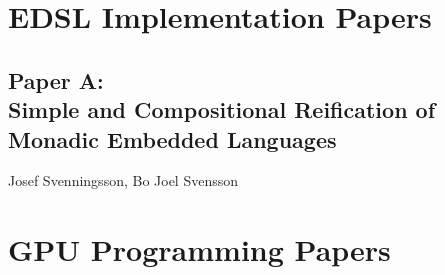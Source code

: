 \documentclass[a4paper]{book}
\newcommand{\paperA}{Paper A}
\newcommand{\paperATitle}{Simple and Compositional Reification of Monadic Embedded Languages}
\begin{document}
%
%





\clearpage{}

%
%


\chapter{EDSL Implementation Papers}
\label{chap:EDSLImplementation}
% 
\cleardoublepage 


\section[\paperATitle]{\paperA: \\ \paperATitle}
\label{sec:paperA}


\begin{center} 
Josef Svenningsson, Bo Joel Svensson
\end{center}






\chapter{GPU Programming Papers}
\label{chap:GPUProgramming}

% 
\cleardoublepage 
\end{document}
